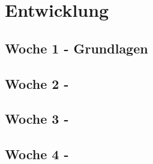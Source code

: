 \section{Entwicklung}
\label{ch:timeline}
\subsection{Woche 1 - Grundlagen}
\label{ch:weekone}
\subsection{Woche 2 - }
\label{ch:weektwo}
\subsection{Woche 3 - }
\label{ch:weekthree}
\subsection{Woche 4 - }
\label{ch:weekfour}
